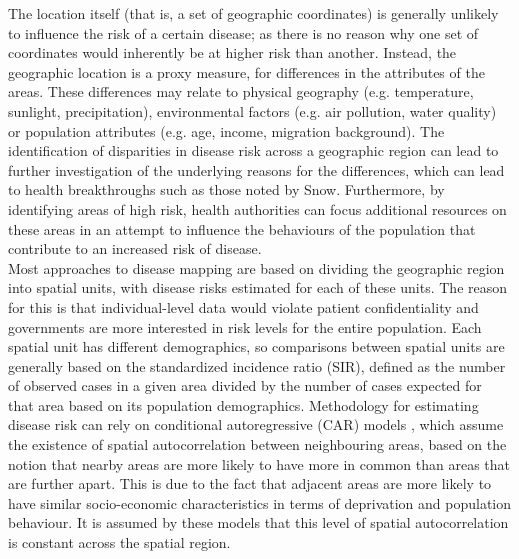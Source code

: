 The location itself (that is, a set of geographic coordinates) is generally unlikely to influence the risk of a certain disease; as there is no reason why one set of coordinates would inherently be at higher risk than another. Instead, the geographic location is a proxy measure, for differences in the attributes of the areas. These differences may relate to physical geography (e.g. temperature, sunlight, precipitation), environmental factors (e.g. air pollution, water quality) or population attributes (e.g. age, income, migration background). The identification of disparities in disease risk across a geographic region can lead to further investigation of the underlying reasons for the differences, which can lead to health breakthroughs such as those noted by Snow. Furthermore, by identifying areas of high risk, health authorities can focus additional resources on these areas in an attempt to influence the behaviours of the population that contribute to an increased risk of disease. \\
Most approaches to disease mapping are based on dividing the geographic region into spatial units, with disease risks estimated for each of these units. The reason for this is that individual-level data would violate patient confidentiality and governments are more interested in risk levels for the entire population. Each spatial unit has different demographics, so comparisons between spatial units are generally based on the standardized incidence ratio (SIR), defined as the number of observed cases in a given area divided by the number of cases expected for that area based on its population demographics.  Methodology for estimating disease risk can rely on conditional autoregressive (CAR) models \autocite[][]{besag1991bayesian}, which assume the existence of spatial autocorrelation between neighbouring areas, based on the notion that nearby areas are more likely to have more in common than areas that are further apart. This is due to the fact that adjacent areas are more likely to have similar socio-economic characteristics in terms of deprivation and population behaviour. It is assumed by these models that this level of spatial autocorrelation is constant across the spatial region.
\clearpage
